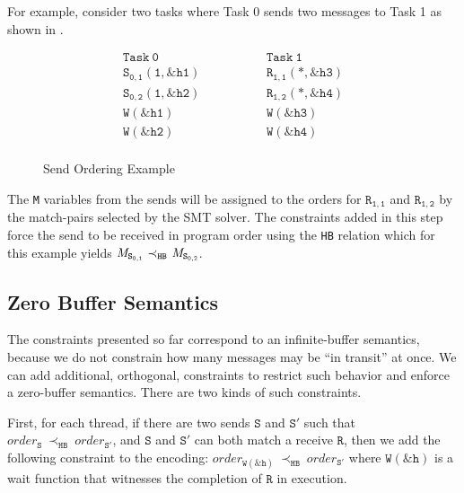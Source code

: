 For example, consider two tasks where Task 0 sends two messages to
Task 1 as shown in .

\begin{figure}[h]
\[
\begin{array}{l|l}
\;\;\;\;\;\;\;\;\mathtt{Task\ 0}\;\;\;\;\;\;\;\; & \;\;\;\;\;\;\;\; \mathtt{Task\ 1}\;\;\;\;\;\;\;\; \\
\hline
\;\;\;\;\;\;\;\;\mathtt{S_{0,1}(1,\&h1)}\;\;\;\;\;\;\;\; & \;\;\;\;\;\;\;\; \mathtt{R_{1,1}(*,\&h3)}\;\;\;\;\;\;\;\; \\
\;\;\;\;\;\;\;\;\mathtt{S_{0,2}(1,\&h2)}\;\;\;\;\;\;\;\; & \;\;\;\;\;\;\;\; \mathtt{R_{1,2}(*,\&h4)}\;\;\;\;\;\;\;\; \\
\;\;\;\;\;\;\;\;\mathtt{W(\&h1)}\;\;\;\;\;\;\;\; & \;\;\;\;\;\;\;\; \mathtt{W(\&h3)}\;\;\;\;\;\;\;\; \\
\;\;\;\;\;\;\;\;\mathtt{W(\&h2)}\;\;\;\;\;\;\;\; & \;\;\;\;\;\;\;\; \mathtt{W(\&h4)}\;\;\;\;\;\;\;\; \\
\end{array}
\]
\caption{Send Ordering Example} \label{fig:step4}
\end{figure}

The \texttt{M} variables from the sends will be assigned to the orders
for $\mathtt{R_{1,1}}$ and $\mathtt{R_{1,2}}$ by the match-pairs
selected by the SMT solver. The constraints added in this step force
the send to be received in program order using the \texttt{HB}
relation which for this example yields
$\cfgnt{M}_\mathtt{S_{0,1}}\ \mathrm{\prec_\mathtt{HB}}\ \cfgnt{M}_\mathtt{S_{0,2}}$.

\subsection{Zero Buffer Semantics}

The constraints presented so far correspond to an infinite-buffer
semantics, because we do not constrain how many messages may be ``in
transit'' at once. We can add additional, orthogonal, constraints to
restrict such behavior and enforce a zero-buffer semantics. There are
two kinds of such constraints.

First, for each thread, if there are two sends $\mathtt{S}$ and
$\mathtt{S'}$ such that
$\mathit{order}_\mathtt{S}\ \mathrm{\prec_\mathtt{HB}}\ \mathit{order}_\mathtt{S'}$,
and $\mathtt{S}$ and $\mathtt{S'}$ can both match a receive
$\mathtt{R}$, then we add the following constraint to the encoding:
$\mathit{order}_{\mathtt{W(\&h)}}\ \mathrm{\prec_{\mathtt{HB}}}\ \mathit{order}_{\mathtt{S'}}$
where $\mathtt{W(\&h)}$ is a wait function that witnesses the
completion of $\mathtt{R}$ in execution.

